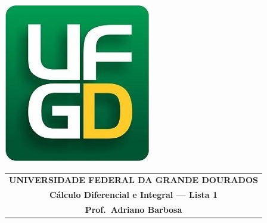 \documentclass[a4paper,5pt]{amsbook}
\begin{document}
\thispagestyle{empty}
\pagestyle{empty}
\begin{minipage}[h]{0.14\textwidth}
	\includegraphics[scale=0.24]{../ufgd.png}
\end{minipage}
\begin{minipage}[h]{\textwidth}
\begin{tabular}{c}
{{\bf UNIVERSIDADE FEDERAL DA GRANDE DOURADOS}}\\
{{\bf C\'alculo Diferencial e Integral --- Lista 1}}\\
{{\bf Prof.\ Adriano Barbosa}}\\
\end{tabular}
\vspace{-0.45cm}
%
\end{minipage}

\end{document}
